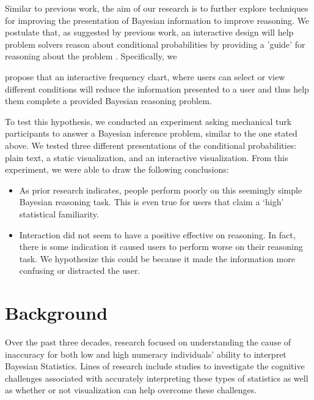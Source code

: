 Similar to previous work, the aim of our research is to further explore
techniques for improving the presentation of Bayesian information to improve
reasoning. We postulate that, as suggested by previous work, an interactive
design will help problem solvers reason about conditional probabilities by
providing a 'guide' for reasoning about the problem \cite{Tsai2011}. Specifically, we

propose that an interactive frequency chart, where users can select or view
different conditions will reduce the information presented to a user and thus
help them complete a provided Bayesian reasoning problem.

To test this hypothesis, we conducted an experiment asking mechanical turk
participants to answer a Bayesian inference problem, similar to the one
stated above. We tested three different presentations of the conditional
probabilities: plain text, a static visualization, and an interactive
visualization. From this experiment, we were able to draw the following
conclusions:

\begin{itemize}
    \item As prior research indicates, people perform poorly on this seemingly simple Bayesian reasoning task. This is even true for users that claim a ‘high’ statistical familiarity.
    \item Interaction did not seem to have a positive effective on reasoning. In fact, there is some indication it caused users to perform worse on their reasoning task. We hypothesize this could be because it made the information more confusing or distracted the user. 
\end{itemize}



\testfigure

\testtable

\demographicstable

\section{Background}
Over the past three decades, research focused on understanding the cause of inaccuracy for both low and high numeracy individuals'
ability to interpret Bayesian Statistics. Lines of research include studies to
investigate the cognitive challenges associated with accurately interpreting
these types of statistics as well as whether or not visualization can help
overcome these challenges. 

